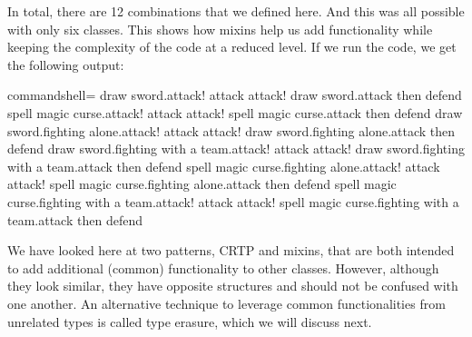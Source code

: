 In total, there are 12 combinations that we defined here. And this was all possible with only six classes. This shows how mixins help us add functionality while keeping the complexity of the code at a reduced level. If we run the code, we get the following output:

\begin{tcblisting}{commandshell={}}
draw sword.attack! attack attack!
draw sword.attack then defend
spell magic curse.attack! attack attack!
spell magic curse.attack then defend
draw sword.fighting alone.attack! attack attack!
draw sword.fighting alone.attack then defend
draw sword.fighting with a team.attack! attack attack!
draw sword.fighting with a team.attack then defend
spell magic curse.fighting alone.attack! attack attack!
spell magic curse.fighting alone.attack then defend
spell magic curse.fighting with a team.attack! attack attack!
spell magic curse.fighting with a team.attack then defend
\end{tcblisting}

We have looked here at two patterns, CRTP and mixins, that are both intended to add additional (common) functionality to other classes. However, although they look similar, they have opposite structures and should not be confused with one another. An alternative technique to leverage common functionalities from unrelated types is called type erasure, which we will discuss next.



































